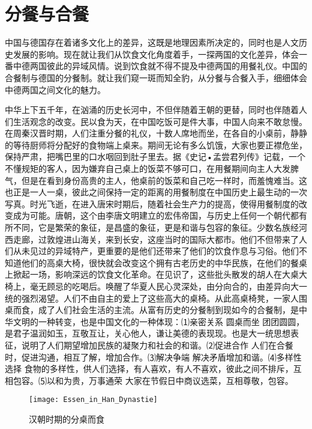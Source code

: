 \section{分餐与合餐}
\par
中国与德国存在着诸多文化上的差异，这既是地理因素所决定的，同时也是人文历史发展的影响。现在就让我们从饮食文化角度着手，一探两国的文化差异，体会一番中德两国彼此的异域风情。说到饮食就不得不提及中德两国的用餐礼仪。中国的合餐制与德国的分餐制。就让我们窥一斑而知全豹，从分餐与合餐入手，细细体会中德两国之间文化的魅力。
\par
中华上下五千年，在汹涌的历史长河中，不但伴随着王朝的更替，同时也伴随着人们生活观念的改变。民以食为天，在中国吃饭可是件大事，中国人向来不敢怠慢。在周秦汉晋时期，人们注重分餐的礼仪，十数人席地而坐，在各自的小桌前，静静的等待厨师将分配好的食物端上桌来。期间无论有多么饥饿，大家也要正襟危坐，保持严肃，把嘴巴里的口水咽回到肚子里去。据《史记•孟尝君列传》记载，一个不懂规矩的客人，因为嫌弃自己桌上的饭菜不够可口，在用餐期间向主人大发脾气，但是在看到身份高贵的主人，他桌前的饭菜和自己吃一样时，而羞愧难当。这也正是一人一桌，彼此之间保持一定的距离的用餐制度在中国历史上最生动的一次写真。时光飞逝，在进入唐宋时期后，随着社会生产力的提高，使得用餐制度的改变成为可能。唐朝，这个由李唐文明建立的宏伟帝国，与历史上任何一个朝代都有所不同，它是繁荣的象征，是昌盛的象征，更是和谐与包容的象征。少数名族经河西走廊，过敦煌进山海关，来到长安，这座当时的国际大都市。他们不但带来了人们从未见过的异域特产，更重要的是他们还带来了他们的饮食作息与习俗。他们不知道他们的高桌大椅，很快就会改变这个拥有古老历史的中华民族，在他们的餐桌上掀起一场，影响深远的饮食文化革命。在见识了，这些批头散发的胡人在大桌大椅上，毫无顾忌的吃喝后。唤醒了华夏人民心灵深处，由分向合的，由差异向大一统的强烈渴望。人们不由自主的爱上了这些高大的桌椅。从此高桌椅凳，一家人围桌而食，成了人们社会生活的主流。从富有历史的分餐制到现如今的合餐制，是中华文明的一种转变，也是中国文化的一种体现：⑴亲密关系  圆桌而坐 团团圆圆，是君子温润如玉，互敬互让，关心他人，谦让美德的表现现。也是大一统思想表征，说明了人们期望增加民族的凝聚力和社会的和谐。⑵促进合作  人们在合餐时，促进沟通，相互了解，增加合作。⑶解决争端  解决矛盾增加和谐。⑷多样性选择  食物的多样性，供人们选择，有人喜欢，有人不喜欢，彼此之间不排斥，互相包容。⑸以和为贵，万事通荣 大家在节假日中商议选菜，互相尊敬，包容。

\begin{figure}
\centering
\texttt{[image: Essen\_in\_Han\_Dynastie]}
\caption{汉朝时期的分桌而食}
\end{figure}

